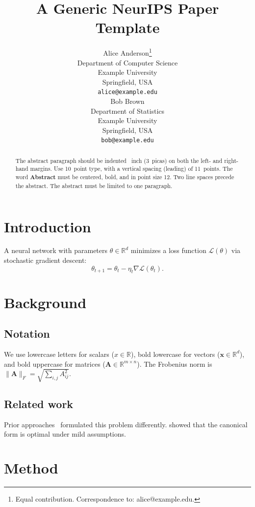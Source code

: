 \documentclass{article}
\title{A Generic NeurIPS Paper Template}
\author{%
  Alice Anderson\thanks{Equal contribution. Correspondence to: alice@example.edu.} \\
  Department of Computer Science \\
  Example University \\
  Springfield, USA \\
  \texttt{alice@example.edu} \\
  \And
  Bob Brown \\
  Department of Statistics \\
  Example University \\
  Springfield, USA \\
  \texttt{bob@example.edu}
}
\begin{document}
\maketitle

\begin{abstract}
The abstract paragraph should be indented ~inch (3~picas) on
both the left- and right-hand margins. Use 10~point type, with a vertical
spacing (leading) of 11~points. The word \textbf{Abstract} must be centered,
bold, and in point size 12. Two line spaces precede the abstract. The abstract
must be limited to one paragraph.
\end{abstract}

\section{Introduction}

A neural network with parameters $\theta \in \mathbb{R}^d$ minimizes a loss
function $\mathcal{L}(\theta)$ via stochastic gradient descent:
\begin{equation}
\theta_{t+1} = \theta_t - \eta_t \nabla \mathcal{L}(\theta_t).
\label{eq:sgd}
\end{equation}

\section{Background}

\subsection{Notation}

We use lowercase letters for scalars ($x \in \mathbb{R}$), bold lowercase for
vectors ($\mathbf{x} \in \mathbb{R}^d$), and bold uppercase for matrices
($\mathbf{A} \in \mathbb{R}^{m \times n}$). The Frobenius norm is
$\|\mathbf{A}\|_F = \sqrt{\sum_{i,j} A_{ij}^2}$.

\subsection{Related work}

Prior approaches~\citep{einstein,dirac} formulated this problem differently.
\citet{bohr} showed that the canonical form is optimal under mild assumptions.

\section{Method}
\end{document}
